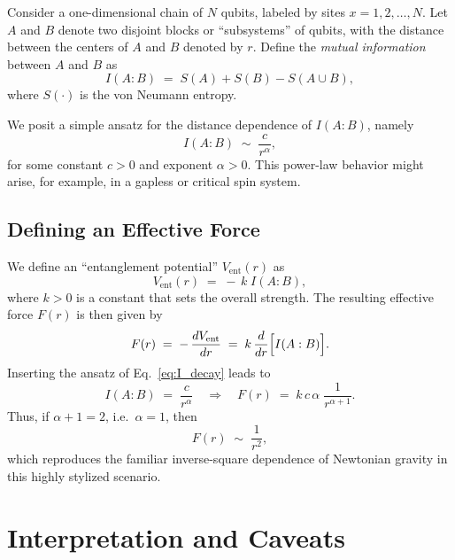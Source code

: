 \documentclass[12pt]{article}
\begin{document}
Consider a one-dimensional chain of $N$ qubits, labeled by sites 
$x = 1, 2, \dots, N$. Let $A$ and $B$ denote two disjoint blocks 
or ``subsystems'' of qubits, with the distance between the centers 
of $A$ and $B$ denoted by $r$. Define the \emph{mutual information} 
between $A$ and $B$ as
\begin{equation}
    I(A : B) \;=\; S(A) + S(B) - S(A \cup B),
\end{equation}
where $S(\cdot)$ is the von Neumann entropy.

We posit a simple ansatz for the distance dependence of $I(A:B)$, 
namely
\begin{equation}
    I(A:B) \;\sim\; \frac{c}{r^\alpha},
    \label{eq:I_decay}
\end{equation}
for some constant $c > 0$ and exponent $\alpha > 0$. This power-law 
behavior might arise, for example, in a gapless or critical spin system.

\subsection{Defining an Effective Force}

We define an ``entanglement potential'' $V_{\mathrm{ent}}(r)$ as
\begin{equation}
    V_{\mathrm{ent}}(r) \;=\; -\,k \; I(A:B),
\end{equation}
where $k > 0$ is a constant that sets the overall strength. The 
resulting effective force $F(r)$ is then given by
\begin{equation}
    F(r) \;=\; -\,\frac{dV_{\mathrm{ent}}}{dr}
    \;=\; k \,\frac{d}{dr} \Bigl[I(A : B)\Bigr].
\end{equation}
Inserting the ansatz of Eq.~\eqref{eq:I_decay} leads to
\begin{equation}
    I(A:B) \;=\; \frac{c}{r^\alpha}
    \quad \Longrightarrow \quad
    F(r) \;=\; k\,c\,\alpha \;\frac{1}{r^{\alpha + 1}}.
\end{equation}
Thus, if $\alpha + 1 = 2$, i.e.\ $\alpha = 1$, then 
\begin{equation}
    F(r) \;\sim\; \frac{1}{r^2},
\end{equation}
which reproduces the familiar inverse-square dependence of Newtonian 
gravity in this highly stylized scenario.

\section{Interpretation and Caveats}
\end{document}
